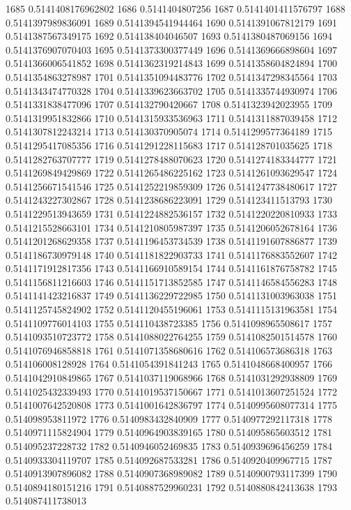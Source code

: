 1685 0.5141408176962802
1686 0.5141404807256
1687 0.5141401411576797
1688 0.5141397989836091
1689 0.5141394541944464
1690 0.5141391067812179
1691 0.5141387567349175
1692 0.514138404046507
1693 0.5141380487069156
1694 0.5141376907070403
1695 0.5141373300377449
1696 0.5141369666898604
1697 0.5141366006541852
1698 0.5141362319214843
1699 0.5141358604824894
1700 0.5141354863278987
1701 0.5141351094483776
1702 0.5141347298345564
1703 0.5141343474770328
1704 0.5141339623663702
1705 0.5141335744930974
1706 0.5141331838477096
1707 0.514132790420667
1708 0.5141323942023955
1709 0.5141319951832866
1710 0.5141315933536963
1711 0.5141311887039458
1712 0.5141307812243214
1713 0.514130370905074
1714 0.5141299577364189
1715 0.5141295417085356
1716 0.5141291228115683
1717 0.514128701035625
1718 0.5141282763707777
1719 0.5141278488070623
1720 0.5141274183344777
1721 0.5141269849429869
1722 0.5141265486225162
1723 0.5141261093629547
1724 0.5141256671541546
1725 0.5141252219859309
1726 0.5141247738480617
1727 0.5141243227302867
1728 0.5141238686223091
1729 0.514123411513793
1730 0.5141229513943659
1731 0.5141224882536157
1732 0.5141220220810933
1733 0.5141215528663101
1734 0.5141210805987397
1735 0.5141206052678164
1736 0.5141201268629358
1737 0.5141196453734539
1738 0.5141191607886877
1739 0.5141186730979148
1740 0.5141181822903733
1741 0.5141176883552607
1742 0.5141171912817356
1743 0.5141166910589154
1744 0.5141161876758782
1745 0.5141156811216603
1746 0.5141151713852585
1747 0.5141146584556283
1748 0.5141141423216837
1749 0.5141136229722985
1750 0.5141131003963038
1751 0.5141125745824902
1752 0.5141120455196061
1753 0.5141115131963581
1754 0.5141109776014103
1755 0.514110438723385
1756 0.5141098965508617
1757 0.5141093510723772
1758 0.5141088022764255
1759 0.5141082501514578
1760 0.5141076946858818
1761 0.5141071358680616
1762 0.514106573686318
1763 0.514106008128928
1764 0.5141054391841243
1765 0.5141048668400957
1766 0.5141042910849865
1767 0.5141037119068966
1768 0.5141031292938809
1769 0.5141025432339493
1770 0.5141019537150667
1771 0.5141013607251524
1772 0.5141007642520808
1773 0.5141001642836797
1774 0.5140995608077314
1775 0.514098953811972
1776 0.5140983432840909
1777 0.5140977292117318
1778 0.5140971115824904
1779 0.5140964903839165
1780 0.514095865603512
1781 0.514095237228732
1782 0.5140946052469835
1783 0.5140939696456259
1784 0.5140933304119707
1785 0.514092687533281
1786 0.5140920409967715
1787 0.5140913907896082
1788 0.5140907368989082
1789 0.5140900793117399
1790 0.5140894180151216
1791 0.5140887529960231
1792 0.5140880842413638
1793 0.514087411738013
